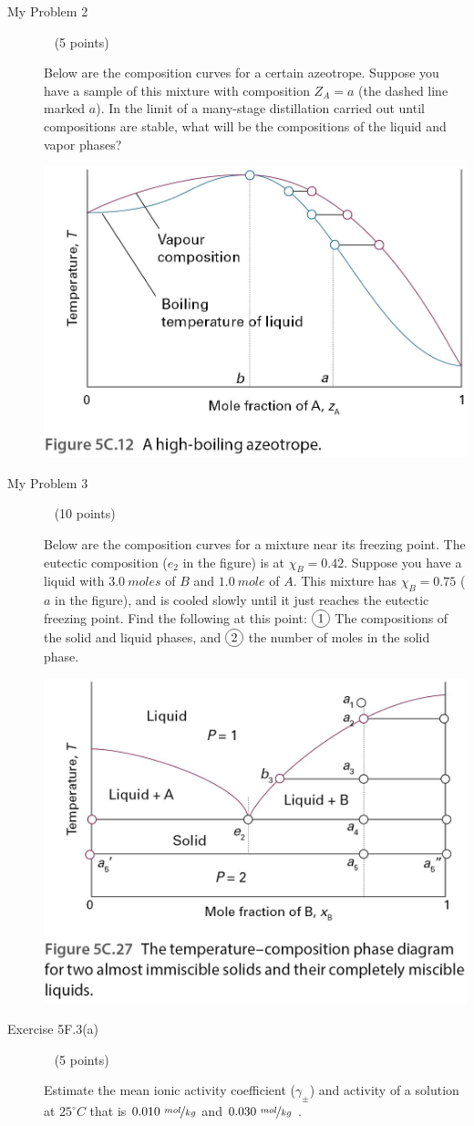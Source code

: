 \documentclass[12pt, openany, letterpaper]{memoir}
\begin{document}
\begin{description}
	      \vspace{35em}
	\item [My Problem 2] ~ (5 points)

	      Below are the composition curves for a certain azeotrope. Suppose you have a sample of this mixture with composition $Z_A = a$ (the dashed line marked $a$). In the limit of a many-stage distillation carried out until compositions are stable, what will be the compositions of the liquid and vapor phases?

	      \noindent\includegraphics[width=0.5\linewidth]{Azeotrope}

	\item [My Problem 3] ~ (10 points)

	      Below are the composition curves for a mixture near its freezing point. The eutectic composition ($e_2$ in the figure) is at $\chi_B = 0.42$. Suppose you have a liquid with $3.0~moles$ of $B$ and $1.0~mole$ of $A$. This mixture has $\chi_B=0.75$ ($a$ in the figure), and is cooled slowly until it just reaches the eutectic freezing point. Find the following at this point: $\circled{1}$ The compositions of the solid and liquid phases, and $\circled{2}$ the number of moles in the solid phase.

	      \noindent\includegraphics[width=0.5\linewidth]{Eutectic}
	      \vspace{15em}

	\item [Exercise 5F.3(a)] ~ (5 points)

	      Estimate the mean ionic activity coefficient ($\gamma_\pm$) and activity of a solution at $25^\circ C$ that is $0.010~\nicefrac{mol}{kg}$  and $0.030~\nicefrac{mol}{kg}$ .


\end{description}
\end{document}
